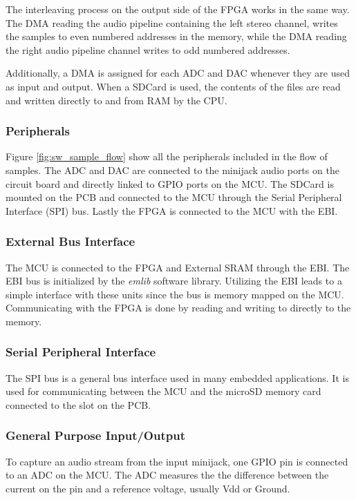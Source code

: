 The interleaving process on the output side of the FPGA works in the same way.
The DMA reading the audio pipeline containing the left stereo channel, writes
the samples to even numbered addresses in the memory, while the DMA reading the
right audio pipeline channel writes to odd numbered addresses.

Additionally, a DMA is assigned for each ADC and DAC whenever they are used as
input and output. When a SDCard is used, the contents of the files are read and
written directly to and from RAM by the CPU.

\subsubsection{Peripherals}



Figure \ref{fig:sw_sample_flow} show all the peripherals included in the flow of samples.
The ADC and DAC are connected to the minijack audio ports on the circuit board and directly
linked to GPIO ports on the MCU. The SDCard
is mounted on the PCB and connected to the MCU through the Serial Peripheral Interface (SPI)
bus. Lastly the FPGA is connected to the MCU with the EBI.

\subsubsection{External Bus Interface}
The MCU is connected to the FPGA and External SRAM through the EBI. The EBI bus
is initialized by the {\it emlib} software library. Utilizing
the EBI leads to a simple interface with these units since the bus is memory
mapped on the MCU. Communicating with the FPGA is done by reading and writing to
directly to the memory.

\subsubsection{Serial Peripheral Interface}
The SPI bus is a general bus interface used in many embedded applications. It is used
for communicating between the MCU and the microSD memory card connected to the slot
on the PCB.

\subsubsection{General Purpose Input/Output}
To capture an audio stream from the input minijack, one GPIO pin is connected to an
ADC on the MCU. The ADC measures the the difference between the current on the pin
and a reference voltage, usually Vdd or Ground.

